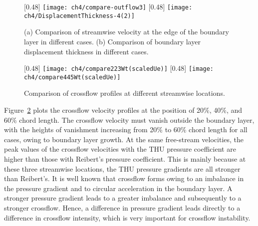 \begin{figure}
\centering
\subcaptionbox{\label{fig:CompOutFlow:a}}[0.48\linewidth] %
    {\texttt{[image: ch4/compare-outflow3]}}
\subcaptionbox{\label{fig:CompOutFlow:b} }[0.48\linewidth]%
    {\texttt{[image: ch4/DisplacementThickness-4(2)]}}
\caption{(a) Comparison of streamwise velocity at the edge of the boundary layer in different cases. (b) Comparison of boundary layer displacement thickness in different cases.}
\label{fig:CompOutFlow} %
\end{figure}
\begin{figure}
\centering
{}[0.48\linewidth]%
{\texttt{[image: ch4/compare223Wt(scaledUe)]}}
 [0.48\linewidth]%
{\texttt{[image: ch4/compare445Wt(scaledUe)]}}
\caption{Comparison of crossflow profiles at different streamwise locations.}
\label{fig:CompCrossProfiles} %
\end{figure}

Figure~\ref{fig:CompCrossProfiles} plots the crossflow velocity profiles at the position of 20\%, 40\%, and 60\% chord length. The crossflow velocity must vanish outside the boundary layer, with the  heights of vanishment increasing from 20\% to 60\% chord length for all cases, owing to  boundary layer growth. At the same free-stream velocities, the peak values of the crossflow velocities with the THU pressure coefficient are higher than those with Reibert's pressure coefficient. This is mainly because at these three streamwise locations, the THU pressure gradients are all stronger than Reibert's. It is well known that  crossflow forms owing to an imbalance in the pressure gradient and to circular acceleration in the boundary layer. A stronger pressure gradient leads to a greater imbalance and subsequently to a stronger crossflow. Hence, a difference in pressure gradient leads directly  to  a difference in crossflow intensity, which is very important for crossflow instability.

